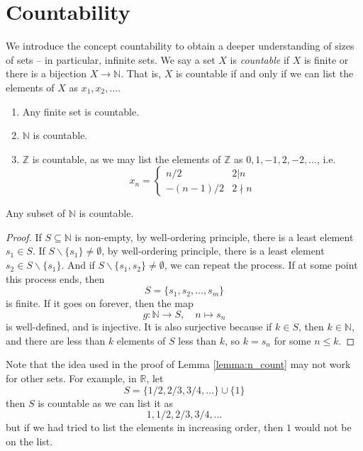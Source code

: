 \documentclass[10pt, a4paper, twoside]{report}
\begin{document}
\section{Countability}
We introduce the concept countability to obtain a deeper understanding of sizes of sets -- in particular, infinite sets. We say a set \(X\) is \emph{countable} if \(X\) is finite or there is a bijection \(X\to\mathbb{N}\). That is, \(X\) is countable if and only if we can list the elements of \(X\) as \(x_1,x_2,\ldots\).
\begin{example} \item[]
    \begin{enumerate}
        \item Any finite set is countable.
        \item \(\mathbb{N}\) is countable. 
        \item \(\mathbb{Z}\) is countable, as we may list the elements of \(\mathbb{Z}\) as \(0,1,-1,2,-2,\ldots\), i.e.
        \[x_n=\begin{cases}
            n/2 & 2|n \\
            -(n-1)/2 & 2\nmid n
        \end{cases}\]
    \end{enumerate}
\end{example}
\begin{lemma}
    Any subset of \(\mathbb{N}\) is countable.
    \label{lemma:n_count}
\end{lemma}
\begin{proof}
    If \(S\subseteq\mathbb{N}\) is non-empty, by well-ordering principle, there is a least element \(s_1\in S\). If \(S\backslash\{s_1\}\neq\emptyset\), by well-ordering principle, there is a least element \(s_2\in S\backslash\{s_1\}\). And if \(S\backslash\{s_1,s_2\}\neq\emptyset\), we can repeat the process. If at some point this process ends, then 
    \[S=\{s_1,s_2,\ldots,s_m\}\]
    is finite. If it goes on forever, then the map
    \[g:\mathbb{N}\to S,\quad n\mapsto s_n\]
    is well-defined, and is injective. It is also surjective because if \(k\in S\), then \(k\in\mathbb{N}\), and there are less than \(k\) elements of \(S\) less than \(k\), so \(k=s_n\) for some \(n\leq k\).
\end{proof}
Note that the idea used in the proof of Lemma \ref{lemma:n_count} may not work for other sets. For example, in \(\mathbb{R}\), let 
\[S=\{1/2,2/3,3/4,\ldots\}\cup\{1\}\]
then \(S\) is countable as we can list it as 
\[1,1/2,2/3,3/4,\ldots\]
but if we had tried to list the elements in increasing order, then \(1\) would not be on the list.
\end{document}
